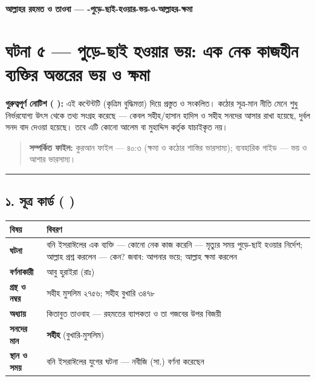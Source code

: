 

\begin{center}{\Large\bfseries\color{emerald} আল্লাহর রহমত ও তাওবা — -পুড়ে-ছাই-হওয়ার-ভয়-ও-আল্লাহর-ক্ষমা}\end{center}
\vspace{1em}
\section*{ঘটনা ৫ — পুড়ে-ছাই হওয়ার ভয়: এক নেক কাজহীন ব্যক্তির অন্তরের ভয় ও ক্ষমা}

\begin{warnbox}
 \textbf{গুরুত্বপূর্ণ নোটিশ ( ):} এই কন্টেন্টটি  (কৃত্রিম বুদ্ধিমত্তা) দিয়ে প্রস্তুত ও সংকলিত।  কঠোর সূত্র-মান নীতি মেনে শুধু নির্ভরযোগ্য উৎস থেকে তথ্য সংগ্রহ করেছে — কেবল সহীহ/হাসান হাদিস ও সহীহ সনদের আসার রাখা হয়েছে, দুর্বল সনদ বাদ দেওয়া হয়েছে। তবে এটি কোনো আলেম বা মুহাদ্দিস কর্তৃক যাচাইকৃত নয়।
\end{warnbox}

\begin{quote}
\textbf{সম্পর্কিত ফাইল:} কুরআন ফাইল — ৪০:৩ (ক্ষমা ও কঠোর শাস্তির ভারসাম্য); ব্যবহারিক গাইড — ভয় ও আশার ভারসাম্য।
\end{quote}

\medskip\hrule\medskip

\subsection*{১. সূত্র কার্ড ( )}

\begin{table}[h]\centering\small
\begin{tabular}{ll}
বিষয় & বিবরণ \\
\hline
\textbf{ঘটনা} & বনি ইসরাঈলের এক ব্যক্তি — কোনো নেক কাজ করেনি — মৃত্যুর সময় পুড়ে-ছাই হওয়ার নির্দেশ; আল্লাহ প্রশ্ন করলেন — কেন? জবাব: আপনার ভয়ে; আল্লাহ ক্ষমা করলেন \\
\textbf{বর্ণনাকারী} & আবু হুরাইরা (রাঃ) \\
\textbf{গ্রন্থ ও নম্বর} & সহীহ মুসলিম ২৭৫৬; সহীহ বুখারি ৩৪৭৮ \\
\textbf{অধ্যায়} & কিতাবুত তাওবাহ — \lat{“}রহমতের ব্যাপকতা ও তা গজবের উপর বিজয়ী\lat{”} \\
\textbf{সনদের মান} & \textbf{সহীহ} (বুখারি-মুসলিম) \\
\textbf{স্থান ও সময়} & বনি ইসরাঈলের যুগের ঘটনা — নবীজি (সা.) বর্ণনা করেছেন \\
\hline
\end{tabular}
\end{table}

